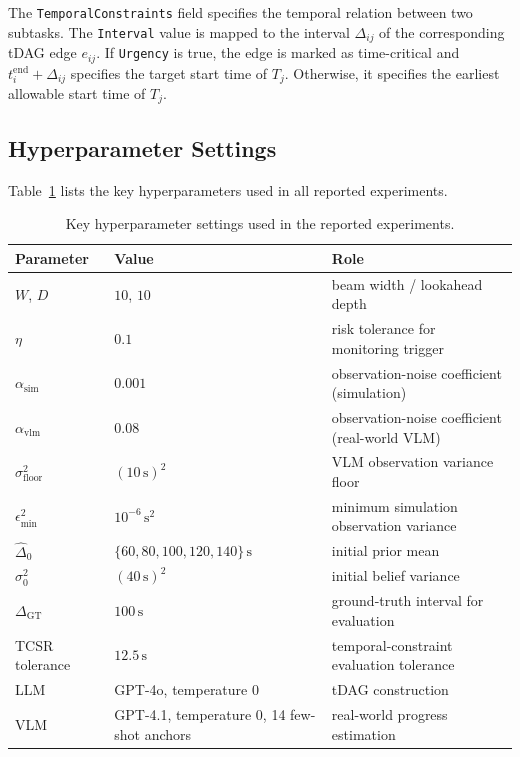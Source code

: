 \documentclass[letterpaper,10pt,onecolumn]{IEEEtran}
\begin{document}
The \texttt{TemporalConstraints} field specifies the temporal relation
between two subtasks. The \texttt{Interval} value is mapped to the
interval $\Delta_{ij}$ of the corresponding tDAG edge $e_{ij}$.
If \texttt{Urgency} is true, the edge is marked as time-critical and
$t_i^{\mathrm{end}}+\Delta_{ij}$ specifies the target start time of $T_j$.
Otherwise, it specifies the earliest allowable start time of $T_j$.


\subsection{Hyperparameter Settings}\label{supp:hyperparams}
Table~\ref{tab:supp_hyperparams} lists the key hyperparameters used in all
reported experiments.
\begin{table}[H]
\centering
\caption{Key hyperparameter settings used in the reported experiments.}
\label{tab:supp_hyperparams}
\begin{tabular}{@{}lll@{}}
\toprule
\textbf{Parameter} & \textbf{Value} & \textbf{Role} \\
\midrule
$W$, $D$ & $10$, $10$ & beam width / lookahead depth \\
$\eta$ & $0.1$ & risk tolerance for monitoring trigger \\
$\alpha_{\mathrm{sim}}$ & $0.001$ & observation-noise coefficient (simulation) \\
$\alpha_{\mathrm{vlm}}$ & $0.08$ & observation-noise coefficient (real-world VLM) \\
$\sigma_{\mathrm{floor}}^2$ & $(10\,\mathrm{s})^2$ & VLM observation variance floor \\
$\epsilon_{\min}^2$ & $10^{-6}\,\mathrm{s}^2$ & minimum simulation observation variance \\
$\hat{\Delta}_0$ & $\{60,80,100,120,140\}\,\mathrm{s}$ & initial prior mean \\
$\sigma_0^2$ & $(40\,\mathrm{s})^2$ & initial belief variance \\
$\Delta_{\mathrm{GT}}$ & $100\,\mathrm{s}$ & ground-truth interval for evaluation \\
TCSR tolerance & $12.5\,\mathrm{s}$ & temporal-constraint evaluation tolerance \\
LLM & GPT-4o, temperature $0$ & tDAG construction \\
VLM & GPT-4.1, temperature $0$, 14 few-shot anchors & real-world progress estimation \\
\bottomrule
\end{tabular}
\end{table}
\end{document}
